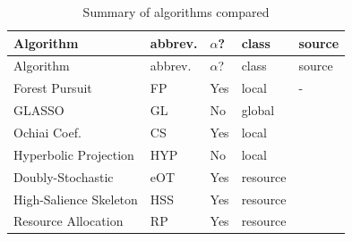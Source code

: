 \documentclass[%
	12pt,
		oneside,
		letterpaper
]{book}
\begin{document}
\begin{longtable}[]{@{}
  >{\raggedright\arraybackslash}p{}
  >{\centering\arraybackslash}p{}
  >{\centering\arraybackslash}p{}
  >{\centering\arraybackslash}p{}
  >{\raggedleft\arraybackslash}p{}@{}}
\caption{Summary of algorithms
compared}\label{tbl-methods}\tabularnewline
\toprule\noalign{}
\begin{minipage}[b]{\linewidth}\raggedright
Algorithm
\end{minipage} & \begin{minipage}[b]{\linewidth}\centering
abbrev.
\end{minipage} & \begin{minipage}[b]{\linewidth}\centering
\(\alpha\)?
\end{minipage} & \begin{minipage}[b]{\linewidth}\centering
class
\end{minipage} & \begin{minipage}[b]{\linewidth}\raggedleft
source
\end{minipage} \\
\midrule\noalign{}
\endfirsthead
\toprule\noalign{}
\begin{minipage}[b]{\linewidth}\raggedright
Algorithm
\end{minipage} & \begin{minipage}[b]{\linewidth}\centering
abbrev.
\end{minipage} & \begin{minipage}[b]{\linewidth}\centering
\(\alpha\)?
\end{minipage} & \begin{minipage}[b]{\linewidth}\centering
class
\end{minipage} & \begin{minipage}[b]{\linewidth}\raggedleft
source
\end{minipage} \\
\midrule\noalign{}
\endhead
\bottomrule\noalign{}
\endlastfoot
Forest Pursuit & FP & Yes & local & - \\
GLASSO & GL & No & global &
\autocite{Sparseinversecovariance_Friedman2008,Structureestimationdiscrete_Loh2012} \\
Ochiai Coef. & CS & Yes & local &
\autocite{Measuresecologicalassociation_Janson1981} \\
Hyperbolic Projection & HYP & No & local &
\autocite{Scientificcollaborationnetworks._Newman2001} \\
Doubly-Stochastic & eOT & Yes & resource &
\autocite{twostagealgorithm_Slater2009,Sinkhorndistanceslightspeed_Cuturi2013} \\
High-Salience Skeleton & HSS & Yes & resource &
\autocite{Robustclassificationsalient_Grady2012} \\
Resource Allocation & RP & Yes & resource &
\autocite{Bipartitenetworkprojection_Zhou2007} \\
\end{longtable}
\end{document}
